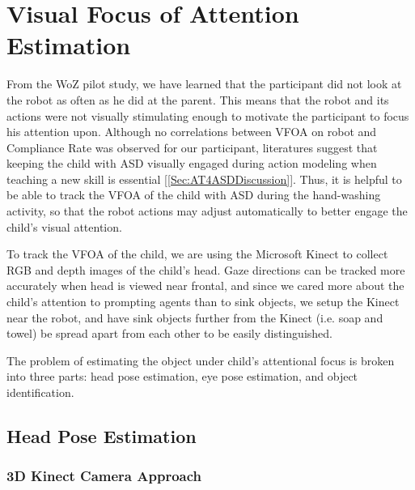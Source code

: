 \documentclass{ut-thesis}
\begin{document}
\chapter{Visual Focus of Attention Estimation}
From the WoZ pilot study, we have learned that the participant did not look at the robot as often as he did at the parent.  This means that the robot and its actions were not visually stimulating enough to motivate the participant to focus his attention upon.  Although no correlations between VFOA on robot and Compliance Rate was observed for our participant, literatures suggest that keeping the child with ASD visually engaged during action modeling when teaching a new skill is essential [\ref{Sec:AT4ASDDiscussion}].  Thus, it is helpful to be able to track the VFOA of the child with ASD during the hand-washing activity, so that the robot actions may adjust automatically to better engage the child's visual attention.

To track the VFOA of the child, we are using the Microsoft Kinect to collect RGB and depth images of the child's head.  Gaze directions can be tracked more accurately when head is viewed near frontal, and since we cared more about the child's attention to prompting agents than to sink objects, we setup the Kinect near the robot, and have sink objects further from the Kinect (i.e. soap and towel) be spread apart from each other to be easily distinguished.

The problem of estimating the object under child's attentional focus is broken into three parts: head pose estimation, eye pose estimation, and object identification.


%
%	
%	



\section{Head Pose Estimation}

%

\subsection{3D Kinect Camera Approach}
\end{document}
